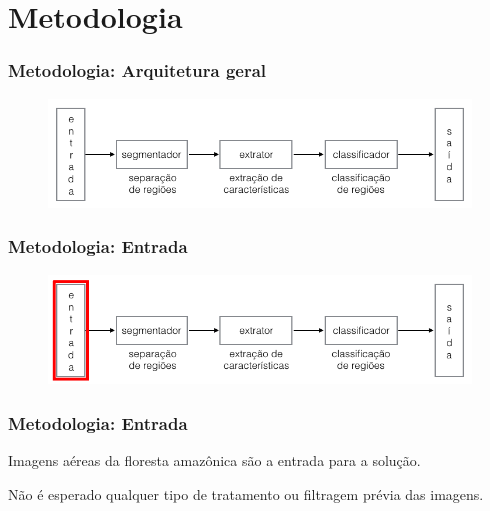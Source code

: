 \documentclass[t]{beamer}
\begin{document}
%
%

%
%

%
%


\section{Metodologia}

\begin{frame}[c]
	\frametitle{Metodologia: Arquitetura geral}
	\begin{figure}[h]
    	\includegraphics[width=\textwidth]{imgs/arquitetura_geral}
	\end{figure}
\end{frame}

\begin{frame}[c]
	\frametitle{Metodologia: Entrada}
	\begin{figure}[h]
    	\includegraphics[width=\textwidth]{imgs/arquitetura_1}
	\end{figure}
\end{frame}

\begin{frame}[c] 
	\frametitle{Metodologia: Entrada}
	
	Imagens aéreas da floresta amazônica são a entrada para a solução.

	\vspace{0.5cm}

	Não é esperado qualquer tipo de tratamento ou filtragem prévia das imagens.
\end{frame}
\end{document}

